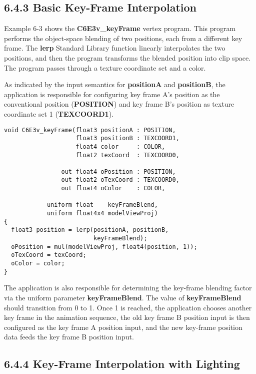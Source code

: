 \documentclass[../main.tex]{subfiles}
\begin{document}
\subsection{6.4.3 Basic Key-Frame Interpolation}

Example 6-3 shows the \textbf{C6E3v_keyFrame} vertex program. This program performs the object-space blending of two positions, each from a different key frame. The \textbf{lerp} Standard Library function linearly interpolates the two positions, and then the program transforms the blended position into clip space. The program passes through a texture coordinate set and a color.

As indicated by the input semantics for \textbf{positionA} and \textbf{positionB}, the application is responsible for configuring key frame A's position as the conventional position (\textbf{POSITION}) and key frame B's position as texture coordinate set 1 (\textbf{TEXCOORD1}).

\FloatBarrier
\begin{lstlisting}[caption=Example 6-3. The \textbf{C6E3v_keyFrame} Vertex Program]
void C6E3v_keyFrame(float3 positionA : POSITION,
                    float3 positionB : TEXCOORD1,
                    float4 color     : COLOR,
                    float2 texCoord  : TEXCOORD0,

                out float4 oPosition : POSITION,
                out float2 oTexCoord : TEXCOORD0,
                out float4 oColor    : COLOR,

            uniform float    keyFrameBlend,
            uniform float4x4 modelViewProj)
{
  float3 position = lerp(positionA, positionB,
                         keyFrameBlend);
  oPosition = mul(modelViewProj, float4(position, 1));
  oTexCoord = texCoord;
  oColor = color;
}
\end{lstlisting}
\FloatBarrier

The application is also responsible for determining the key-frame blending factor via the uniform parameter \textbf{keyFrameBlend}. The value of \textbf{keyFrameBlend} should transition from 0 to 1. Once 1 is reached, the application chooses another key frame in the animation sequence, the old key frame B position input is then configured as the key frame A position input, and the new key-frame position data feeds the key frame B position input.

\subsection{6.4.4 Key-Frame Interpolation with Lighting}
\end{document}
